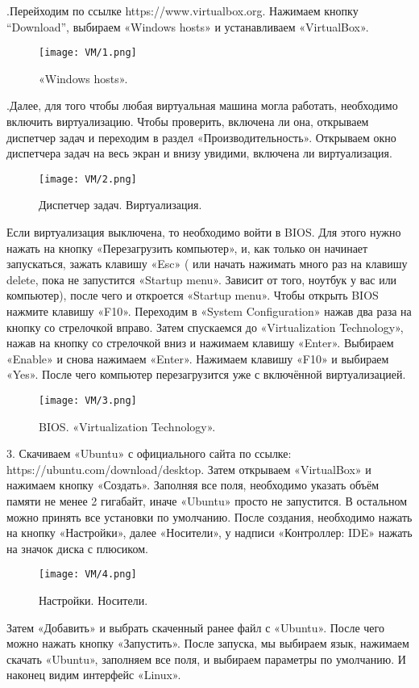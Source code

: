 
.\quad Перейходим по ссылке https://www.virtualbox.org. Нажимаем кнопку “Download”, выбираем «Windows hosts» и устанавливаем «VirtualBox». 

\begin{figure}[h]	
		\centering
		\texttt{[image: VM/1.png]}
\caption{«Windows hosts».}
\label{ris:image}
\end{figure}

.\quad Далее, для того чтобы любая виртуальная машина могла работать, необходимо включить виртуализацию. Чтобы проверить, включена ли она, открываем диспетчер задач и переходим в раздел «Производительность». Открываем окно диспетчера задач на весь экран и внизу увидими, включена ли виртуализация.

\begin{figure}[h]
		\centering
		\texttt{[image: VM/2.png]}
\caption{Диспетчер задач. Виртуализация.}
\label{ris:image}
\end{figure}

\quad Если виртуализация выключена, то необходимо войти в BIOS. Для этого нужно нажать на кнопку «Перезагрузить компьютер», и, как только он начинает запускаться, зажать клавишу «Esc» ( или начать нажимать много раз на клавишу delete, пока не запустится «Startup menu». Зависит от того, ноутбук у вас или компьютер), после чего и откроется «Startup menu». Чтобы открыть BIOS нажмите клавишу «F10». Переходим в «System Configuration» нажав два раза на кнопку со стрелочкой вправо. Затем спускаемся до «Virtualization Technology», нажав на кнопку со стрелочкой вниз и нажимаем клавишу «Enter». Выбираем «Enable» и снова нажимаем «Enter». Нажимаем клавишу «F10» и выбираем «Yes». После чего компьютер перезагрузится уже с включённой виртуализацией.

\begin{figure}[h]
		\centering
		\texttt{[image: VM/3.png]}
\caption{BIOS. «Virtualization Technology».}
\label{ris:image}
\end{figure}

3. Скачиваем «Ubuntu» с официального сайта по ссылке: https://ubuntu.com/download/desktop. Затем открываем «VirtualBox» и нажимаем кнопку «Создать». Заполняя все поля, необходимо указать объём памяти не менее 2 гигабайт, иначе «Ubuntu» просто не запустится. В остальном можно принять все установки по умолчанию. После создания, необходимо нажать на кнопку «Настройки», далее «Носители», у надписи «Контроллер: IDE» нажать на значок диска с плюсиком. 

\begin{figure}[h]
		\centering
		\texttt{[image: VM/4.png]}
\caption{Настройки. Носители.}
\label{ris:image}

\end{figure}

\quad Затем «Добавить» и выбрать скаченный ранее файл с «Ubuntu». После чего можно нажать кнопку «Запустить». После запуска, мы выбираем язык, нажимаем скачать «Ubuntu», заполняем все поля, и выбираем параметры по умолчанию. И наконец видим интерфейс «Linux».
